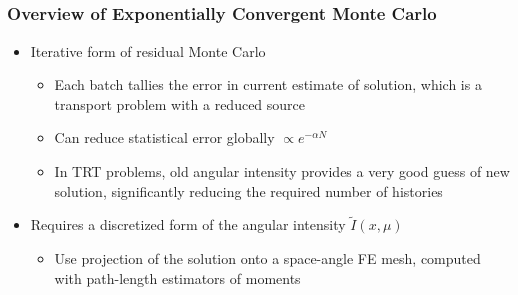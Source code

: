 \documentclass[xcolor=dvipsnames,hyperref={pdfpagelabels=false},handout,unknownkeysallowed]{beamer}
\newcommand{\colb}[1]{{\color{blue} #1}}
\newcommand{\colr}[1]{{\color{red} #1}}
\newlength{\wideitemsep}
\let\olditem\item
\renewcommand{\item}{\setlength{\itemsep}{\wideitemsep}\olditem}
\begin{document}
\subsection{}



\begin{frame}
    \frametitle{Overview of Exponentially Convergent Monte Carlo}
    \begin{itemize}
        \item Iterative form of residual Monte Carlo
      \begin{itemize}
          \item Each batch tallies the \colb{error} in current estimate of solution, which
            is a transport problem with a reduced source
    \item Can reduce statistical error \colb{globally} $\propto e^{-\alpha N}$
           \item In TRT problems, old angular intensity provides a very good guess of new
               solution, significantly reducing the required number of histories
\end{itemize}
     \end{itemize}
    \begin{minipage}{0.6\linewidth}
        \vspace{-2.0in}
     \begin{itemize}
        \item Requires a \colr{discretized} form of the angular intensity $\tilde I(x,\mu)$
            \begin{itemize}
                \item Use \colb{projection} of the solution onto a space-angle FE
                    mesh, computed with path-length estimators of moments
    \end{itemize}
    \end{itemize}
    \end{minipage}
    \begin{minipage}[t]{0.3\linewidth}
        \centering
    \end{minipage}%
\end{frame}
\end{document}
